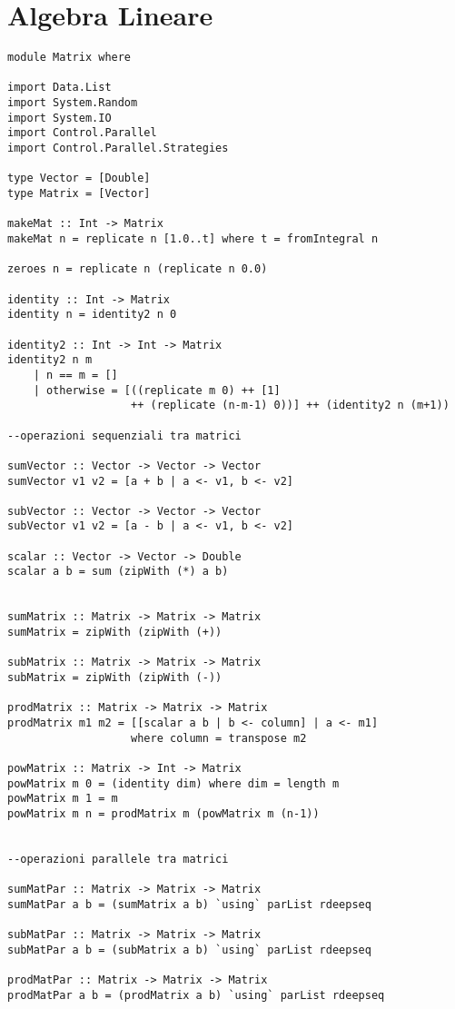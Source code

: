 \section{Algebra Lineare}
\begin{verbatim}
module Matrix where

import Data.List
import System.Random
import System.IO
import Control.Parallel
import Control.Parallel.Strategies
	
type Vector = [Double]
type Matrix = [Vector]	

makeMat :: Int -> Matrix
makeMat n = replicate n [1.0..t] where t = fromIntegral n

zeroes n = replicate n (replicate n 0.0)

identity :: Int -> Matrix
identity n = identity2 n 0

identity2 :: Int -> Int -> Matrix
identity2 n m 
    | n == m = []
    | otherwise = [((replicate m 0) ++ [1] 
                   ++ (replicate (n-m-1) 0))] ++ (identity2 n (m+1))  

--operazioni sequenziali tra matrici

sumVector :: Vector -> Vector -> Vector
sumVector v1 v2 = [a + b | a <- v1, b <- v2]

subVector :: Vector -> Vector -> Vector
subVector v1 v2 = [a - b | a <- v1, b <- v2]
					  
scalar :: Vector -> Vector -> Double
scalar a b = sum (zipWith (*) a b)


sumMatrix :: Matrix -> Matrix -> Matrix
sumMatrix = zipWith (zipWith (+))

subMatrix :: Matrix -> Matrix -> Matrix
subMatrix = zipWith (zipWith (-))

prodMatrix :: Matrix -> Matrix -> Matrix
prodMatrix m1 m2 = [[scalar a b | b <- column] | a <- m1]
                   where column = transpose m2

powMatrix :: Matrix -> Int -> Matrix
powMatrix m 0 = (identity dim) where dim = length m
powMatrix m 1 = m
powMatrix m n = prodMatrix m (powMatrix m (n-1))
	
	
--operazioni parallele tra matrici
	
sumMatPar :: Matrix -> Matrix -> Matrix
sumMatPar a b = (sumMatrix a b) `using` parList rdeepseq

subMatPar :: Matrix -> Matrix -> Matrix
subMatPar a b = (subMatrix a b) `using` parList rdeepseq
	  
prodMatPar :: Matrix -> Matrix -> Matrix
prodMatPar a b = (prodMatrix a b) `using` parList rdeepseq
\end{verbatim}
